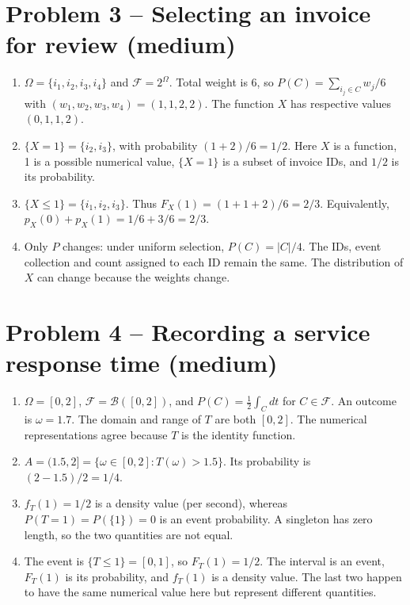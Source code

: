\documentclass[11pt,a4paper]{article}
\begin{document}
\section*{Problem 3 -- Selecting an invoice for review (medium)}
\begin{enumerate}
\item $\Omega=\{i_1,i_2,i_3,i_4\}$ and $\mathcal F=2^\Omega$. Total weight is $6$, so $P(C)=\sum_{i_j\in C}w_j/6$ with $(w_1,w_2,w_3,w_4)=(1,1,2,2)$. The function $X$ has respective values $(0,1,1,2)$.
\item $\{X=1\}=\{i_2,i_3\}$, with probability $(1+2)/6=1/2$. Here $X$ is a function, 1 is a possible numerical value, $\{X=1\}$ is a subset of invoice IDs, and $1/2$ is its probability.
\item $\{X\le1\}=\{i_1,i_2,i_3\}$. Thus $F_X(1)=(1+1+2)/6=2/3$. Equivalently, $p_X(0)+p_X(1)=1/6+3/6=2/3$.
\item Only $P$ changes: under uniform selection, $P(C)=|C|/4$. The IDs, event collection and count assigned to each ID remain the same. The distribution of $X$ can change because the weights change.
\end{enumerate}
\section*{Problem 4 -- Recording a service response time (medium)}
\begin{enumerate}
\item $\Omega=[0,2]$, $\mathcal F=\mathcal B([0,2])$, and $P(C)=\tfrac12\int_C dt$ for $C\in\mathcal F$. An outcome is $\omega=1.7$. The domain and range of $T$ are both $[0,2]$. The numerical representations agree because $T$ is the identity function.
\item $A=(1.5,2]=\{\omega\in[0,2]:T(\omega)>1.5\}$. Its probability is $(2-1.5)/2=1/4$.
\item $f_T(1)=1/2$ is a density value (per second), whereas $P(T=1)=P(\{1\})=0$ is an event probability. A singleton has zero length, so the two quantities are not equal.
\item The event is $\{T\le1\}=[0,1]$, so $F_T(1)=1/2$. The interval is an event, $F_T(1)$ is its probability, and $f_T(1)$ is a density value. The last two happen to have the same numerical value here but represent different quantities.
\end{enumerate}
\clearpage
\end{document}
